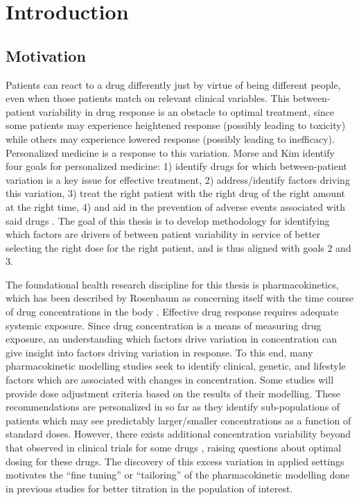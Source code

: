 \chapter{Introduction}

\section{Motivation}

Patients can react to a drug differently just by virtue of being different people, even when those patients match on relevant clinical variables.  This between-patient variability in drug response is an obstacle to optimal treatment, since some patients may experience heightened response (possibly leading to toxicity) while others may experience lowered response (possibly leading to inefficacy).  Personalized medicine is a response to this variation.  Morse and Kim identify four goals for personalized medicine: 1) identify drugs for which between-patient variation is a key issue for effective treatment,  2) address/identify factors driving this variation, 3) treat the right patient with the right drug  of the right amount at the right time, 4) and aid in the prevention of adverse events associated with said drugs \cite{morse2015personalized}.  The goal of this thesis is to develop methodology for identifying which factors are drivers of between patient variability in service of better selecting the right dose for the right patient, and is thus aligned with goals 2 and 3.

The foundational health research discipline for this thesis is pharmacokinetics, which has been described by Rosenbaum as concerning itself with the time course of drug concentrations in the body \cite{rosenbaum2016basic}.
Effective drug response requires adequate systemic exposure.  Since drug concentration is a means of measuring drug exposure,  an understanding which factors drive variation in concentration can give insight into factors driving variation in response.  To this end, many pharmacokinetic modelling studies seek to identify clinical, genetic, and lifestyle factors which are associated with changes in concentration. Some studies will provide dose adjustment criteria based on the results of their modelling. These recommendations are personalized in so far as they identify sub-populations of patients which may see predictably larger/smaller concentrations as a function of standard doses. However, there exists additional concentration variability beyond that observed in clinical trials for some drugs \cite{sukumar2019apixaban}, raising questions about optimal dosing for these drugs.  The discovery of this excess variation in applied settings motivates the ``fine tuning'' or ``tailoring'' of the pharmacokinetic modelling done in previous studies for better titration in the population of interest.

